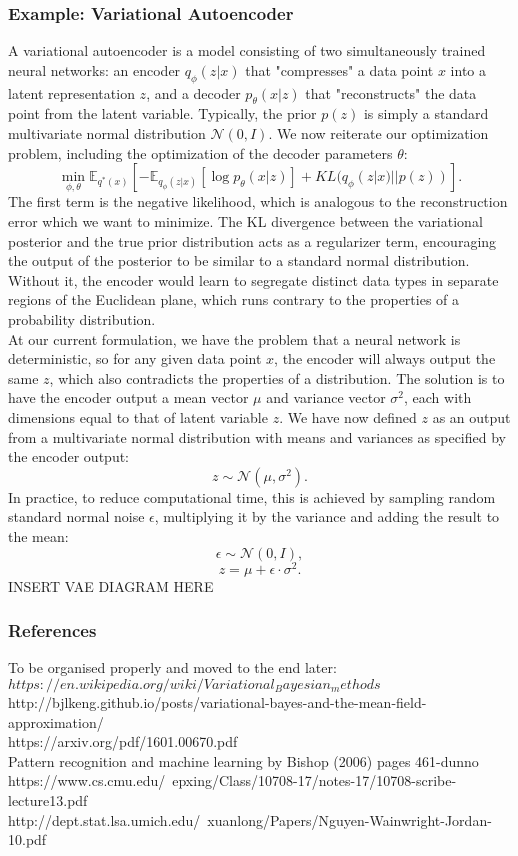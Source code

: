 \documentclass[a4paper,12pt]{article}
\newcommand{\N}{\mathcal{N}}
\newcommand{\E}{\mathbb{E}}
\numberwithin{equation}{section}
\begin{document}
\subsubsection{Example: Variational Autoencoder}
A variational autoencoder is a model consisting of two simultaneously trained neural networks: an encoder $q_\phi(z|x)$ that "compresses" a data point $x$ into a latent representation $z$, and a decoder $p_\theta(x|z)$ that "reconstructs" the data point from the latent variable. Typically, the prior $p(z)$ is simply a standard multivariate normal distribution $\N(0,I)$. We now reiterate our optimization problem, including the optimization of the decoder parameters $\theta$:
\[\min_{\phi,\theta} \mathbb{E}_{q^*(x)}\left[-\E_{q_\phi(z|x)}[\log p_\theta(x|z)]+KL(q_\phi(z|x)||p(z))\right].\]
The first term is the negative likelihood, which is analogous to the reconstruction error which we want to minimize. The KL divergence between the variational posterior and the true prior distribution acts as a regularizer term, encouraging the output of the posterior to be similar to a standard normal distribution. Without it, the encoder would learn to segregate distinct data types in separate regions of the Euclidean plane, which runs contrary to the properties of a probability distribution.\\
At our current formulation, we have the problem that a neural network is deterministic, so for any given data point $x$, the encoder will always output the same $z$, which also contradicts the properties of a distribution. The solution is to have the encoder output a mean vector $\mu$ and variance vector $\sigma^2$, each with dimensions equal to that of latent variable $z$. We have now defined $z$ as an output from a multivariate normal distribution with means and variances as specified by the encoder output:
\[z\sim \N(\mu,\sigma^2).\]
In practice, to reduce computational time, this is achieved by sampling random standard normal noise $\epsilon$, multiplying it by the variance and adding the result to the mean:
\[\epsilon\sim \N(0,I),\]
\[z=\mu+\epsilon\cdot\sigma^2.\]
INSERT VAE DIAGRAM HERE
\subsubsection{References}
To be organised properly and moved to the end later:\\
$https://en.wikipedia.org/wiki/Variational_Bayesian_methods$ \\
http://bjlkeng.github.io/posts/variational-bayes-and-the-mean-field-approximation/ \\
https://arxiv.org/pdf/1601.00670.pdf \\
Pattern recognition and machine learning by Bishop (2006) pages 461-dunno \\
https://www.cs.cmu.edu/~epxing/Class/10708-17/notes-17/10708-scribe-lecture13.pdf \\
http://dept.stat.lsa.umich.edu/~xuanlong/Papers/Nguyen-Wainwright-Jordan-10.pdf\\
\end{document}
